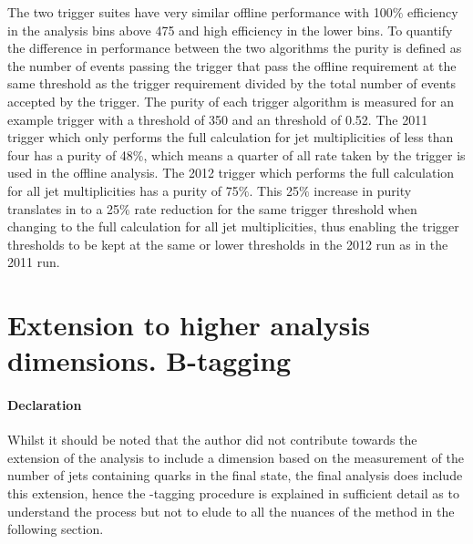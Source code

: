 The two trigger suites have very similar offline performance with 100$\%$ 
efficiency in the analysis bins above \unit{475}{\GeV} and high efficiency in 
the lower bins. To quantify the difference in performance between the two 
algorithms the purity is defined as the number of events passing the trigger 
that pass the offline \alt requirement at the same threshold as the trigger requirement divided by the total number of events 
accepted by the trigger.
The purity of each trigger algorithm is measured for an example trigger with a 
\HT threshold of \unit{350}{\GeV} and an \alt threshold of 0.52.
The 2011 trigger which only performs the full \alt calculation for jet 
multiplicities of less than four has a purity of 48$\%$, which means a quarter 
of all rate taken by the trigger is used in the offline analysis.
The 2012 trigger which performs the full \alt calculation for all jet 
multiplicities has a purity of 75$\%$. This 25$\%$ increase in purity 
translates in to a 25$\%$ rate reduction for the same trigger threshold when
changing to the full \alt calculation for all jet multiplicities, thus enabling 
the trigger thresholds to be kept at the same or lower thresholds in the 2012 
run as in the 2011 run.


\section{Extension to higher analysis dimensions. B-tagging} %
\label{sec:extension_to_higher_analysis_dimensions_}
\paragraph{Declaration} %
\label{par:declaration-btagging}
Whilst it should be noted that the author did not contribute towards the 
extension of the analysis to include a dimension based on the measurement of 
the number of jets containing \Pbottom quarks in the final state, the final 
analysis does include this extension, hence the \Pbottom-tagging procedure is 
explained in sufficient detail as to understand the process but not to elude to 
all the nuances of the method in the following section.





